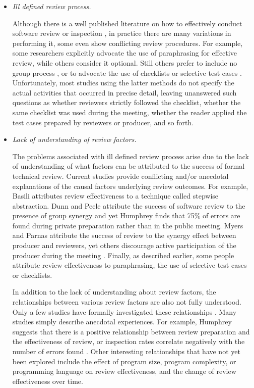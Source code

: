 \begin {itemize}

\item {\sl Ill defined review process.}

Although there is a well published literature on how to
effectively conduct software review or inspection \cite{Fagan76}, in
practice there are many variations in performing it, some even show
conflicting review procedures.  For example, some researchers
\cite{Fagan76,Russell91} explicitly advocate the use of paraphrasing
for effective review, while others \cite{Humphrey90} consider it
optional. Still others prefer to include no group process
\cite{Knight91}, or to advocate the use of checklists
\cite{Fagan76,Humphrey90,Freedman90} or selective test cases
\cite{Ackerman89,Dunn84}.  Unfortunately, most studies using the
latter methods do not specify the actual activities that occurred in
precise detail, leaving unanswered such questions as whether reviewers
strictly followed the checklist, whether the same checklist was used
during the meeting, whether the reader applied the test cases prepared
by reviewers or producer, and so forth.


\item {\sl Lack of understanding of review factors.}

The problems associated with ill defined review process arise due to
the lack of understanding of what factors can be attributed to the
success of formal technical review. Current studies provide
conflicting and/or anecdotal explanations of the causal factors
underlying review outcomes.  For example, Basili \cite{Basili85}
attributes review effectiveness to a technique called stepwise
abstraction. Dunn \cite{Dunn84} and Peele \cite{Peele82} attribute the
success of software review to the presence of group synergy and yet
Humphrey \cite{Humphrey90} finds that 75\% of errors are found during
private preparation rather than in the public meeting. Myers
\cite{Myers79} and Parnas \cite{Parnas85} attribute the success of
review to the synergy effect between producer and reviewers, yet
others discourage active participation of the producer during the
meeting \cite{Ackerman89,Russell91}. Finally, as described earlier,
some people \cite{Russell91,Ackerman89,Freedman90} attribute review
effectiveness to paraphrasing, the use of selective test cases or
checklists.


In addition to the lack of understanding about review factors, the
relationships between various review factors are also not fully
understood.  Only a few studies have formally investigated these
relationships \cite{Bisant89}. Many studies simply describe anecdotal
experiences.  For example, Humphrey \cite{Humphrey90} suggests that
there is a positive relationship between review preparation and the
effectiveness of review, or inspection rates correlate negatively with
the number of errors found \cite{Gilb88}.  Other interesting
relationships that have not yet been explored include the effect of
program size, program complexity, or programming language on review
effectiveness, and the change of review effectiveness over time.


\end{itemize}
